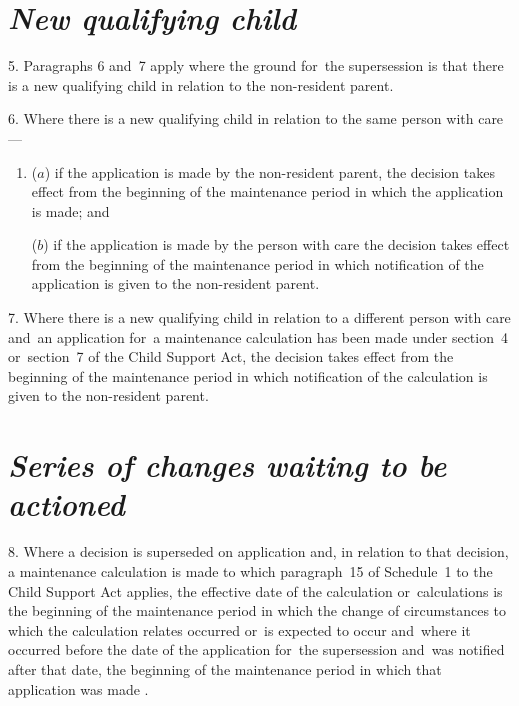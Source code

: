 \documentclass[12pt,a4paper]{article}
\begin{document}
{\section*{\itshape New qualifying child}

5.  Paragraphs 6 and~7 apply where the ground for~the supersession is that there is a new qualifying child in relation to the non-resident parent.

\medskip

6.  Where there is a new qualifying child in relation to the same person with care—
\begin{enumerate}\item[]
($a$) if the application is made by the non-resident parent, the decision takes effect from the beginning of the maintenance period in which the application is made; and

($b$) if the application is made by the person with care the decision takes effect from the beginning of the maintenance period in which notification of the application is given to the non-resident parent.
\end{enumerate}

\medskip

7.  Where there is a new qualifying child in relation to a different person with care and~an application for~a maintenance calculation has been made under section~4 or~section~7 of the Child Support Act, the decision takes effect from the beginning of the maintenance period in which notification of the calculation is given to the non-resident parent.

\section*{\itshape\sloppy Series of changes waiting to be actioned}

8.  Where a decision is superseded on application and, in relation to that decision, a maintenance calculation is made to which paragraph~15 of Schedule~1 to the Child Support Act applies, the effective date of the calculation or~calculations is the beginning of the maintenance period in which the change of circumstances to which the calculation relates occurred or~is expected to occur and~where it occurred before the date of the application for~the supersession and~was notified after that date, 
the beginning of the maintenance period in which that application was made%
.%

}
\end{document}
